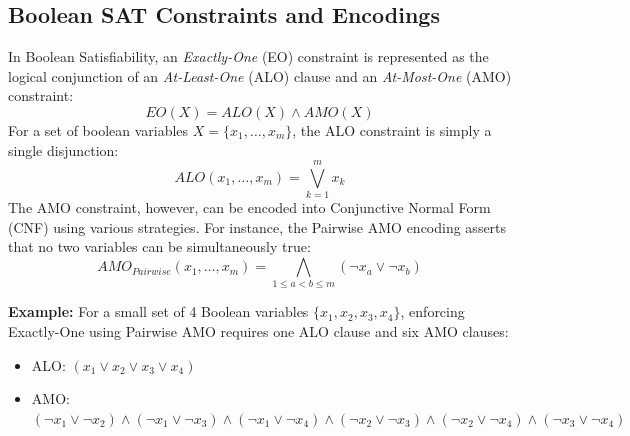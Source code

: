 \subsection{Boolean SAT Constraints and Encodings}
In Boolean Satisfiability, an \textit{Exactly-One} (EO) constraint is represented as the logical conjunction of an \textit{At-Least-One} (ALO) clause and an \textit{At-Most-One} (AMO) constraint:
\begin{equation}
EO(X) = ALO(X) \land AMO(X)
\end{equation}
For a set of boolean variables $X = \{x_1, \ldots, x_m\}$, the ALO constraint is simply a single disjunction:
\begin{equation}
ALO(x_1,\ldots,x_m)=\bigvee_{k=1}^{m}x_k
\end{equation}
The AMO constraint, however, can be encoded into Conjunctive Normal Form (CNF) using various strategies. For instance, the Pairwise AMO encoding asserts that no two variables can be simultaneously true:
\begin{equation}
AMO_{Pairwise}(x_1,\ldots,x_m)= \bigwedge_{1\le a<b\le m} (\neg x_a \lor \neg x_b)
\end{equation}

\textbf{Example:} For a small set of 4 Boolean variables $\{x_1, x_2, x_3, x_4\}$, enforcing Exactly-One using Pairwise AMO requires one ALO clause and six AMO clauses:
\begin{itemize}
    \item ALO: $(x_1 \lor x_2 \lor x_3 \lor x_4)$
    \item AMO: $(\neg x_1 \lor \neg x_2) \land (\neg x_1 \lor \neg x_3) \land (\neg x_1 \lor \neg x_4) \land (\neg x_2 \lor \neg x_3) \land (\neg x_2 \lor \neg x_4) \land (\neg x_3 \lor \neg x_4)$
\end{itemize}

